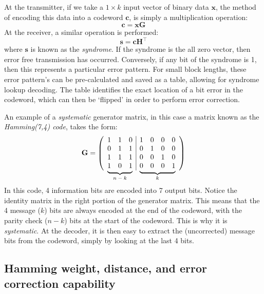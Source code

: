 \documentclass[11pt]{article}
\newcommand\undermat[2]{%
  \makebox[0pt][l]{$\smash{\underbrace{\phantom{%
    \begin{matrix}#2\end{matrix}}}_{\text{$#1$}}}$}#2}
\numberwithin{equation}{subsection}
\begin{document}
At the transmitter, if we take a $1 \times k$ input vector of binary data $\mathbf{x}$, the method of encoding this data into a codeword $\mathbf{c}$, is simply a multiplication operation:
\begin{equation}
\mathbf{c = xG}
\end{equation}
At the receiver, a similar operation is performed:
\begin{equation}
\mathbf{s = c H}^\top
\end{equation}
where $\mathbf{s}$ is known as the \textit{syndrome}. If the syndrome is the all zero vector, then error free transmission has occurred. Conversely, if any bit of the syndrome is 1, then this represents a particular error pattern. For small block lengths, these error pattern's can be pre-calculated and saved as a table, allowing for syndrome lookup decoding. The table identifies the exact location of a bit error in the codeword, which can then be `flipped' in order to perform error correction.

An example of a \textit{systematic} generator matrix, in this case a matrix known as the \textit{Hamming(7,4) code}, takes the form:
\begin{equation}
\mathbf{G} = 
\left(
\begin{array}{ccc|cccc}
  1 & 1 & 0 & 1 & 0 & 0 & 0 \\
  0 & 1 & 1 & 0 & 1 & 0 & 0 \\
  1 & 1 & 1 & 0 & 0 & 1 & 0 \\
  \undermat{n-k}{1 & 0 & 1} & \undermat{k}{0 & 0 & 0 & 1} \\
  \end{array}
\right)
\end{equation}
\\
In this code, 4 information bits are encoded into 7 output bits.
Notice the identity matrix in the right portion of the generator matrix. This means that the 4 message ($k$) bits are always encoded at the end of the codeword, with the parity check ($n-k$) bits at the start of the codeword. This is why it is \textit{systematic}. At the decoder, it is then easy to extract the (uncorrected) message bits from the codeword, simply by looking at the last 4 bits.

\subsection{Hamming weight, distance, and error correction capability}
\end{document}
